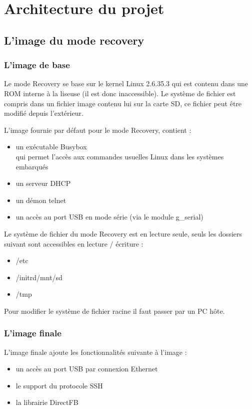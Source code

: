 \chapter{Architecture du projet}

\section{L'image du mode recovery}

\subsection{L'image de base}
Le mode Recovery se base sur le kernel Linux 2.6.35.3 qui est contenu dans une ROM interne à la liseuse (il est donc inaccessible). Le système de fichier est compris dans un fichier image contenu lui sur la carte SD, ce fichier peut être modifié depuis l'extérieur.

L'image fournie par défaut pour le mode Recovery, contient : 
\begin{itemize}
	\item un exécutable Busybox \\
		qui permet l'accès aux commandes usuelles Linux dans les systèmes embarqués
	\item un serveur DHCP
	\item un démon telnet
	\item un accès au port USB en mode série (via le module g_serial)
\end{itemize}


Le système de fichier du mode Recovery est en lecture seule, seuls les dossiers suivant sont accessibles en lecture / écriture : 
\begin{itemize}
	\item /etc
	\item /initrd/mnt/sd
	\item /tmp
\end{itemize}

Pour modifier le système de fichier racine il faut passer par un PC hôte.

\subsection{L'image finale}

L'image finale ajoute les fonctionnalités suivante à l'image : 
	\begin{itemize}
		\item un accès au port USB par connexion Ethernet
		\item le support du protocole SSH
		\item la librairie DirectFB
	\end{itemize}

